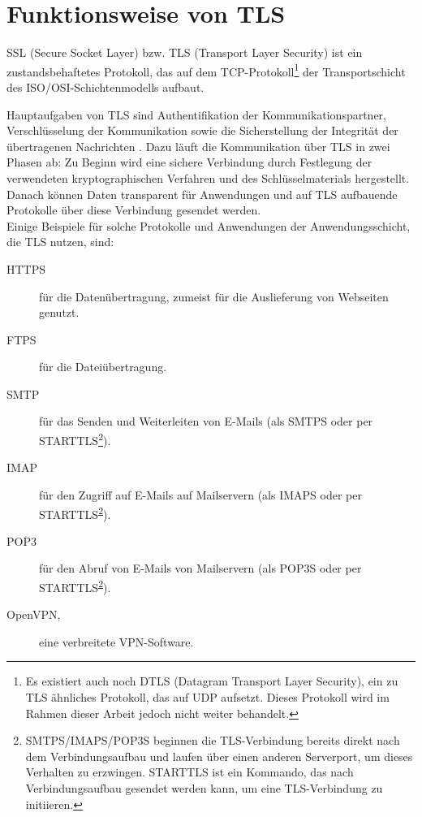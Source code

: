 

\lstset{style=tls}

\chapter{Funktionsweise von TLS}

\label{sec_tls_overview}

SSL (Secure Socket Layer) bzw. TLS (Transport Layer Security) ist ein zustandsbehaftetes Protokoll, das auf dem TCP-Protokoll\footnote{
	Es existiert auch noch DTLS (Datagram Transport Layer Security), ein zu TLS ähnliches Protokoll, das auf UDP aufsetzt. Dieses Protokoll wird im Rahmen dieser Arbeit jedoch nicht weiter behandelt.
} der Transportschicht des ISO/OSI-Schichtenmodells aufbaut. 

Hauptaufgaben von TLS sind Authentifikation der Kommunikationspartner, Verschlüsselung der Kommunikation sowie die Sicherstellung der Integrität der übertragenen Nachrichten \cite{meyer14}. Dazu läuft die Kommunikation über TLS in zwei Phasen ab: Zu Beginn wird eine sichere Verbindung durch Festlegung der verwendeten kryptographischen Verfahren und des Schlüsselmaterials hergestellt. Danach können Daten transparent für Anwendungen und auf TLS aufbauende Protokolle über diese Verbindung gesendet werden.\\
Einige Beispiele für solche Protokolle und Anwendungen der Anwendungsschicht, die TLS nutzen, sind:
\begin{description}
\item[HTTPS] für die Datenübertragung, zumeist für die Auslieferung von Webseiten genutzt. 
\item[FTPS] für die Dateiübertragung.
\item[SMTP] für das Senden und Weiterleiten von E-Mails (als SMTPS oder per STARTTLS\footnote{\label{fn_starttls}
	SMTPS/IMAPS/POP3S beginnen die TLS-Verbindung bereits direkt nach dem Verbindungsaufbau und laufen über einen anderen Serverport, um dieses Verhalten zu erzwingen. STARTTLS ist ein Kommando, das nach Verbindungsaufbau gesendet werden kann, um eine TLS-Verbindung zu initiieren.}).
\item[IMAP] für den Zugriff auf E-Mails auf Mailservern (als IMAPS oder per STARTTLS\textsuperscript{\ref{fn_starttls}}).
\item[POP3] für den Abruf von E-Mails von Mailservern (als POP3S oder per STARTTLS\textsuperscript{\ref{fn_starttls}}).
\item[OpenVPN,] eine verbreitete VPN-Software.
\end{description}

